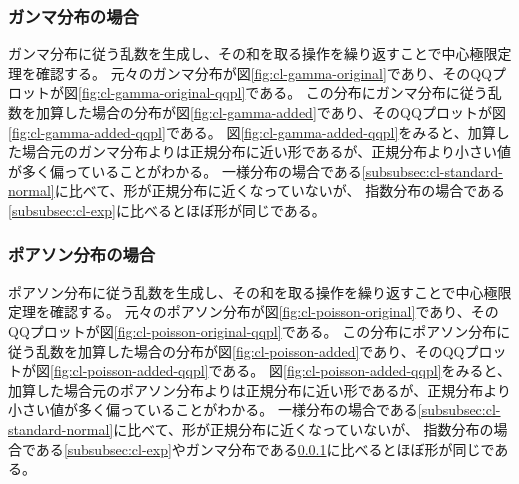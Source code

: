 \subsubsection{ガンマ分布の場合}\label{subsubsec:cl-gamma}
ガンマ分布に従う乱数を生成し、その和を取る操作を繰り返すことで中心極限定理を確認する。
元々のガンマ分布が図\ref{fig:cl-gamma-original}であり、そのQQプロットが図\ref{fig:cl-gamma-original-qqpl}である。
この分布にガンマ分布に従う乱数を加算した場合の分布が図\ref{fig:cl-gamma-added}であり、そのQQプロットが図\ref{fig:cl-gamma-added-qqpl}である。
図\ref{fig:cl-gamma-added-qqpl}をみると、加算した場合元のガンマ分布よりは正規分布に近い形であるが、正規分布より小さい値が多く偏っていることがわかる。
一様分布の場合である\ref{subsubsec:cl-standard-normal}に比べて、形が正規分布に近くなっていないが、
指数分布の場合である\ref{subsubsec:cl-exp}に比べるとほぼ形が同じである。


\subsubsection{ポアソン分布の場合}\label{subsubsec:cl-poisson}
ポアソン分布に従う乱数を生成し、その和を取る操作を繰り返すことで中心極限定理を確認する。
元々のポアソン分布が図\ref{fig:cl-poisson-original}であり、そのQQプロットが図\ref{fig:cl-poisson-original-qqpl}である。
この分布にポアソン分布に従う乱数を加算した場合の分布が図\ref{fig:cl-poisson-added}であり、そのQQプロットが図\ref{fig:cl-poisson-added-qqpl}である。
図\ref{fig:cl-poisson-added-qqpl}をみると、加算した場合元のポアソン分布よりは正規分布に近い形であるが、正規分布より小さい値が多く偏っていることがわかる。
一様分布の場合である\ref{subsubsec:cl-standard-normal}に比べて、形が正規分布に近くなっていないが、
指数分布の場合である\ref{subsubsec:cl-exp}やガンマ分布である\ref{subsubsec:cl-gamma}に比べるとほぼ形が同じである。

